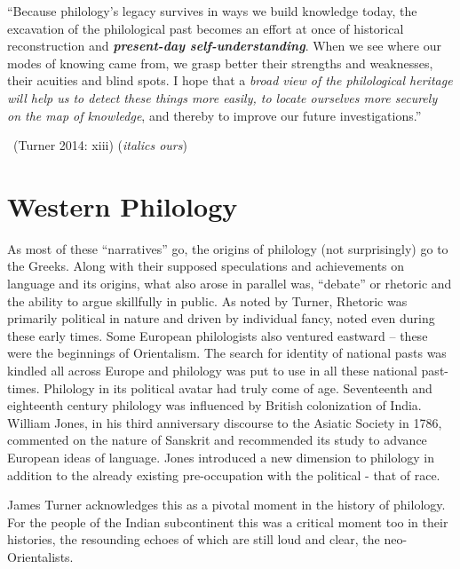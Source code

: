 \begin{myquote}
“Because philology’s legacy survives in ways we build knowledge today, the excavation of the philological past becomes an effort at once of historical reconstruction and \textbf{\textit{present-day self-understanding}}. When we see where our modes of knowing came from, we grasp better their strengths and weaknesses, their acuities and blind spots. I hope that a \textit{broad view of the philological heritage will help us to detect these things more easily, to locate ourselves more securely on the map of knowledge}, and thereby to improve our future investigations.”

~\hfill (Turner 2014: xiii) (\textit{italics ours})
\end{myquote}


\section*{Western Philology}

\vskip 3pt

As most of these “narratives” go, the origins of philology (not surprisingly) go to the Greeks. Along with their supposed speculations and achievements on language and its origins, what also arose in parallel was, “debate” or rhetoric and the ability to argue skillfully in public. As noted by Turner, Rhetoric was primarily political in nature and driven by individual fancy, noted even during these early times. Some European philologists also ventured eastward – these were the beginnings of Orientalism. The search for identity of national pasts was kindled all across Europe and philology was put to use in all these national past-times. Philology in its political avatar had truly come of age. Seventeenth and eighteenth century philology was influenced by British colonization of India. William Jones, in his third anniversary discourse to the Asiatic Society in 1786, commented on the nature of Sanskrit and recommended its study to advance European ideas of language. Jones introduced a new dimension to philology in addition to the already existing pre-occupation with the political - that of race.

James Turner acknowledges this as a pivotal moment in the history of philology. For the people of the Indian subcontinent this was a critical moment too in their histories, the resounding echoes of which are still loud and clear, the neo-Orientalists.

